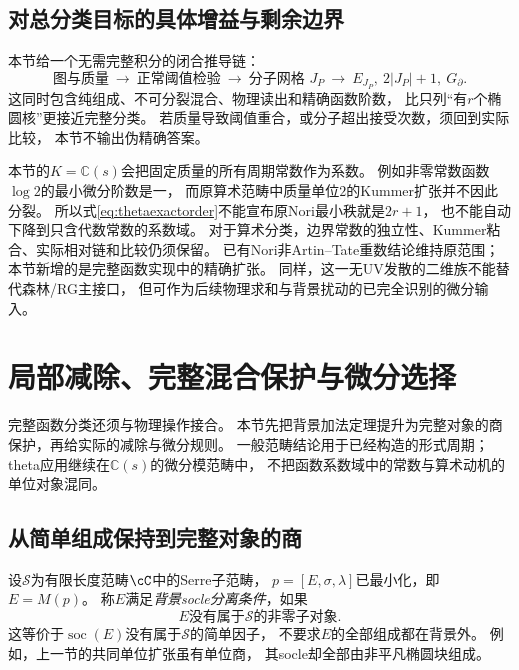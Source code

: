 \documentclass[11pt,a4paper]{ctexart}
\theoremstyle{cnplain}\newtheorem{theorem}{定理}[section]
\theoremstyle{definition}\newtheorem{definition}[theorem]{定义}
\theoremstyle{remark}\newtheorem{remark}[theorem]{注}
\newcommand{\cS}{\mathcal S}\newcommand{\dR}{\mathrm{dR}}
\begin{document}
\subsection{对总分类目标的具体增益与剩余边界}
本节给一个无需完整积分的闭合推导链：
\[
 \text{图与质量}\ \longrightarrow\
 \text{正常阈值检验}\ \longrightarrow\
 \text{分子网格 }J_P\ \longrightarrow\
 E_{J_P},\ 2|J_P|+1,\ G_{\partial}.
\]
这同时包含纯组成、不可分裂混合、物理读出和精确函数阶数，
比只列“有$r$个椭圆核”更接近完整分类。
若质量导致阈值重合，或分子超出接受次数，须回到实际比较，
本节不输出伪精确答案。

本节的$K=\mathbb C(s)$会把固定质量的所有周期常数作为系数。
例如非零常数函数$\log2$的最小微分阶数是一，
而原算术范畴中质量单位$2$的Kummer扩张并不因此分裂。
所以式\eqref{eq:thetaexactorder}不能宣布原Nori最小秩就是$2r+1$，
也不能自动下降到只含代数常数的系数域。
对于算术分类，边界常数的独立性、Kummer粘合、实际相对链和比较仍须保留。
已有Nori非Artin--Tate重数结论维持原范围；本节新增的是完整函数实现中的精确扩张。
同样，这一无UV发散的二维族不能替代森林/RG主接口，
但可作为后续物理求和与背景扰动的已完全识别的微分输入。



\section{局部减除、完整混合保护与微分选择}
\label{sec:fullprotection}
完整函数分类还须与物理操作接合。
本节先把背景加法定理提升为完整对象的商保护，再给实际的减除与微分规则。
一般范畴结论用于已经构造的形式周期；
theta应用继续在$\mathbb C(s)$的微分模范畴中，
不把函数系数域中的常数与算术动机的单位对象混同。

\subsection{从简单组成保持到完整对象的商}
设$\cS$为有限长度范畴$\cC$中的Serre子范畴，
$p=[E,\sigma,\lambda]$已最小化，即$E=M(p)$。
称$E$满足\emph{背景socle分离条件}，如果
\begin{equation}\label{eq:socleseparation}
 E\text{没有属于}\cS\text{的非零子对象}.
\end{equation}
这等价于$\operatorname{soc}(E)$没有属于$\cS$的简单因子，
不要求$E$的全部组成都在背景外。
例如，上一节的共同单位扩张虽有单位商，
其socle却全部由非平凡椭圆块组成。
\end{document}
